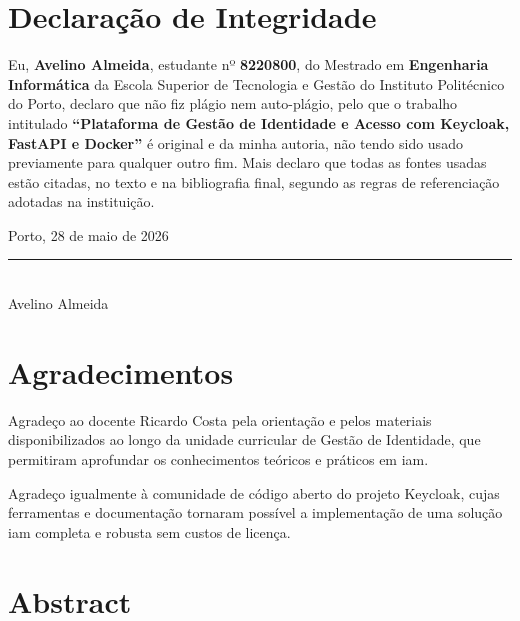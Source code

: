 \documentclass[12pt,a4paper,twoside]{report}
\begin{document}





\chapter*{Declaração de Integridade}

Eu, \textbf{Avelino Almeida}, estudante nº \textbf{8220800}, do Mestrado em \textbf{Engenharia Informática} da Escola Superior de Tecnologia e Gestão do Instituto Politécnico do Porto, declaro que não fiz plágio nem auto-plágio, pelo que o trabalho intitulado \textbf{``Plataforma de Gestão de Identidade e Acesso com Keycloak, FastAPI e Docker''} é original e da minha autoria, não tendo sido usado previamente para qualquer outro fim. Mais declaro que todas as fontes usadas estão citadas, no texto e na bibliografia final, segundo as regras de referenciação adotadas na instituição.

\vspace{1.5cm}
\noindent Porto, 28 de maio de 2026

\vspace{1cm}
\noindent\rule{7cm}{0.4pt}\\
Avelino Almeida

\chapter*{Agradecimentos}

Agradeço ao docente Ricardo Costa pela orientação e pelos materiais disponibilizados ao longo da unidade curricular de Gestão de Identidade, que permitiram aprofundar os conhecimentos teóricos e práticos em \gls{iam}.

Agradeço igualmente à comunidade de código aberto do projeto Keycloak, cujas ferramentas e documentação tornaram possível a implementação de uma solução \gls{iam} completa e robusta sem custos de licença.

\chapter*{Abstract}
\end{document}
